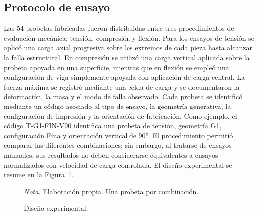 \documentclass[10pt,twocolumn]{article}
\begin{document}
\subsection{Protocolo de ensayo}
Las 54 probetas fabricadas fueron distribuidas entre tres procedimientos de evaluación mecánica: tensión, compresión y flexión. Para los ensayos de tensión se aplicó una carga axial progresiva sobre los extremos de cada pieza hasta alcanzar la falla estructural. En compresión se utilizó una carga vertical aplicada sobre la probeta apoyada en una superficie, mientras que en flexión se empleó una configuración de viga simplemente apoyada con aplicación de carga central. La fuerza máxima se registró mediante una celda de carga y se documentaron la deformación, la masa y el modo de falla observado. Cada probeta se identificó mediante un código asociado al tipo de ensayo, la geometría generativa, la configuración de impresión y la orientación de fabricación. Como ejemplo, el código T-G1-FIN-V90 identifica una probeta de tensión, geometría G1, configuración Fina y orientación vertical de 90°. El procedimiento permitió comparar las diferentes combinaciones; sin embargo, al tratarse de ensayos manuales, sus resultados no deben considerarse equivalentes a ensayos normalizados con velocidad de carga controlada. El diseño experimental se resume en la Figura~\ref{fig:diseno}.
\begin{figure}[t]
\centering
{}
\caption{Diseño experimental.}\label{fig:diseno}
\par\footnotesize\textit{Nota.} Elaboración propia. Una probeta por combinación.
\end{figure}
\end{document}
